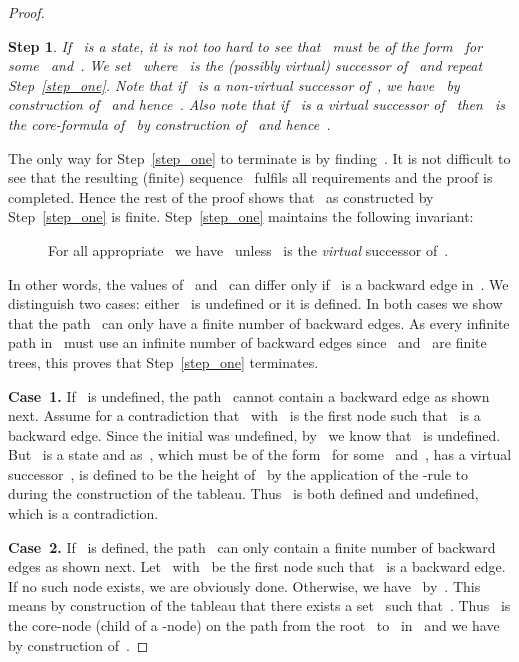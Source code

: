 \documentclass{entcs}
\newtheorem{stp}{Step}
\newenvironment{step}{\vspace{-\lastskip}\par \addvspace{.6pc
    plus .2pc minus .1pc}\begin{stp}\rm}{\end{stp}\par\addvspace{.6pc
    plus .2pc minus .1pc}}
\newcommand{\trea}{}
\begin{document}
\begin{center}
\begin{proof}
\begin{step}
    If~ is a state,
    it is not too hard to see that~ must be of the form~
    for some~ and~.
    We set~
    where~ is the (possibly virtual) successor of~
    and repeat Step~\ref{step_one}.
    Note that if~ is a non-virtual successor of~,
    we have~
    by construction of~ and hence~.
    Also note that if~ is a virtual successor of~
    then~ is the core-formula of~ by construction of~ and hence~.
  \end{step}
  The only way for Step~\ref{step_one} to terminate is
  by finding~.
  It is not difficult to see that
  the resulting (finite) sequence~ fulfils all requirements and the proof is completed.
  Hence the rest of the proof shows that~ as constructed by Step~\ref{step_one} is finite.
  Step~\ref{step_one} maintains the following invariant:
  \begin{description}
  \item[] For all appropriate~
    we have~
    unless~ is the \emph{virtual} successor of~.
  \end{description}
  In other words, the values of~
  and~ can differ only if~ is a backward edge in~.
  We distinguish two cases: either~ is undefined or it is defined.
  In both cases we show that the path~
  can only have a finite number of backward edges.
  As every infinite path in~ must use an infinite number of backward edges
  since~ and~ are finite trees,
  this proves that Step~\ref{step_one} terminates.

  \noindent{}\textbf{Case~1.} If~ is undefined,
  the path~ cannot contain a backward edge as shown next.
  Assume for a contradiction that~ with~ is the first node
  such that~ is a backward edge.
  Since the initial  was undefined,
  by~ we know that~ is undefined.
  But~ is a state and as~,
  which must be of the form~ for some~ and~,
  has a virtual successor~,
   is defined
  to be the height of~ by the application of the \trea{}-rule to~
  during the construction of the tableau.
  Thus~ is both defined and undefined,
  which is a contradiction.

  \noindent{}\textbf{Case~2.} If~ is defined,
  the path~ can only contain a finite number of backward edges as shown next.
  Let~ with~ be the first node
  such that~ is a backward edge.
  If no such node exists, we are obviously done.
  Otherwise, we have~ by~.
  This means by construction of the tableau
  that there exists a set~ such that~.
  Thus~ is the  core-node (child of a \trea{}-node)
  on the path from the root~ to~ in~
  and we have~ by construction of~.


\end{proof}
\end{center}
\end{document}
